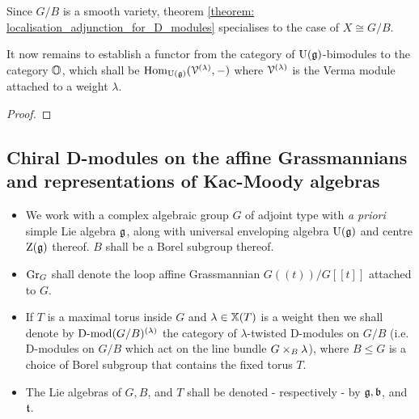                 \begin{corollary}
                    Since $G/B$ is a smooth variety, theorem \ref{theorem: localisation_adjunction_for_D_modules} specialises to the case of $X \cong G/B$.
                \end{corollary}
                
                It now remains to establish a functor from the category of $\mathrm{U}(\mathfrak{g})$-bimodules to the category $\mathbb{O}$, which shall be $\mathrm{Hom}_{\mathrm{U}(\mathfrak{g})}(\mathcal{V}^{(\lambda)}, -)$ where $\mathcal{V}^{(\lambda)}$ is the Verma module attached to a weight $\lambda$. 
                \begin{theorem} \label{theorem: beilinson_bernstein_localisation}
                    
                \end{theorem}
                    \begin{proof}
                        
                    \end{proof}
                \begin{corollary} \label{coro: borel_weil_bott_theorem}
                    
                \end{corollary}
        
        \subsection{Chiral D-modules on the affine Grassmannians and representations of Kac-Moody algebras} \label{subsection: localisation_of_affine_lie_algebras}
            \begin{convention} \label{conv: chiral_beilinson_bernstein_localisation_conventions}
                \noindent
                \begin{itemize}
                    \item We work with a complex algebraic group $G$ of adjoint type with \textit{a priori} simple Lie algebra $\mathfrak{g}$, along with universal enveloping algebra $\mathrm{U}(\mathfrak{g})$ and centre $\mathrm{Z}(\mathfrak{g})$ thereof. $B$ shall be a Borel subgroup thereof. 
                    \item $\mathrm{Gr}_G$ shall denote the loop affine Grassmannian $G(\!(t)\!)/G[\![t]\!]$ attached to $G$.
                    \item If $T$ is a maximal torus inside $G$ and $\lambda \in \mathbb{X}(T)$ is a weight then we shall denote by $\mathrm{D}\text{-}\mathrm{mod}(G/B)^{(\lambda)}$ the category of $\lambda$-twisted D-modules on $G/B$ (i.e. D-modules on $G/B$ which act on the line bundle $G \x_B \lambda$), where $B \leq G$ is a choice of Borel subgroup that contains the fixed torus $T$.
                    \item The Lie algebras of $G, B$, and $T$ shall be denoted - respectively - by $\mathfrak{g}, \mathfrak{b}$, and $\mathfrak{t}$.
                \end{itemize}
            \end{convention}
            

